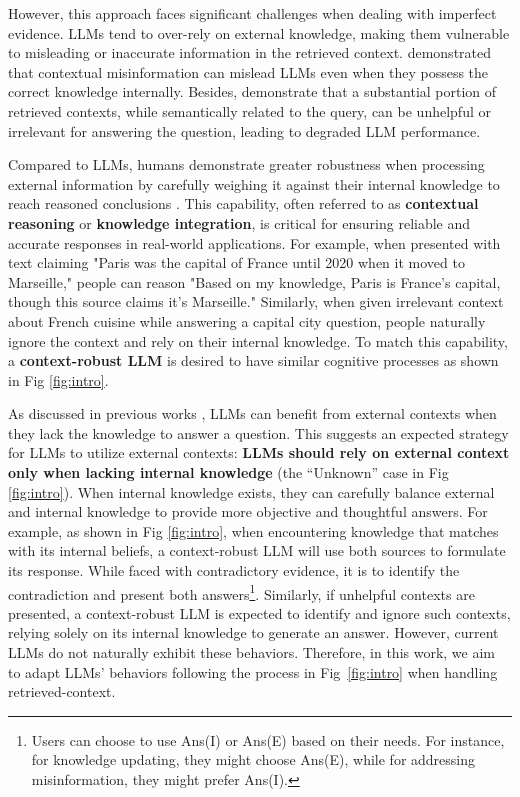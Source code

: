 However, this approach faces significant challenges when dealing with imperfect evidence. LLMs tend to over-rely on external knowledge, making them vulnerable to misleading or inaccurate information in the retrieved context. \citet{zou2024poisonedrag,dengpandora} demonstrated that contextual misinformation can mislead LLMs even when they possess the correct knowledge internally.  Besides, \citet{yoranmaking,fang-etal-2024-enhancing} demonstrate that a substantial portion of retrieved contexts, while semantically related to the query, can be unhelpful or irrelevant for answering the question, leading to degraded LLM performance.

Compared to LLMs, humans demonstrate greater robustness when processing external information by carefully weighing it against their internal knowledge to reach reasoned conclusions \cite{hollister2017contextual}. This capability, often referred to as \textbf{contextual reasoning} or \textbf{knowledge integration}, is critical for ensuring reliable and accurate responses in real-world applications. For example, when presented with text claiming "Paris was the capital of France until 2020 when it moved to Marseille," people can reason "Based on my knowledge, Paris is France's capital, though this source claims it's Marseille." Similarly, when given irrelevant context about French cuisine while answering a capital city question, people naturally ignore the context and rely on their internal knowledge.  To match this capability, a \textbf{context-robust LLM} is desired to have similar cognitive processes as shown in Fig \ref{fig:intro}.

As discussed in previous works \cite{wang2024astute,yoranmaking}, LLMs can benefit from external contexts when they lack the knowledge to answer a question. This suggests an expected strategy for LLMs to utilize external contexts: \textbf{LLMs should rely on external context only when lacking internal knowledge} (the ``Unknown'' case in Fig \ref{fig:intro}). When internal knowledge exists, they can carefully balance external and internal knowledge to provide more objective and thoughtful answers\cite{chen2024benchmarking}. For example, as shown in Fig \ref{fig:intro}, when encountering knowledge that matches with its internal beliefs, a context-robust LLM will use both sources to formulate its response. While faced with contradictory evidence, it is to identify the contradiction and present both answers\footnote{Users can choose to use Ans(I) or Ans(E) based on their needs. For instance, for knowledge updating, they might choose Ans(E), while for addressing misinformation, they might prefer Ans(I).}. Similarly, if unhelpful contexts are presented, a context-robust LLM is expected to identify and ignore such contexts, relying solely on its internal knowledge to generate an answer\cite{yoranmaking}. However, current LLMs do not naturally exhibit these behaviors. Therefore, in this work, we aim to adapt LLMs' behaviors following the process in Fig~\ref{fig:intro} when handling retrieved-context.  





